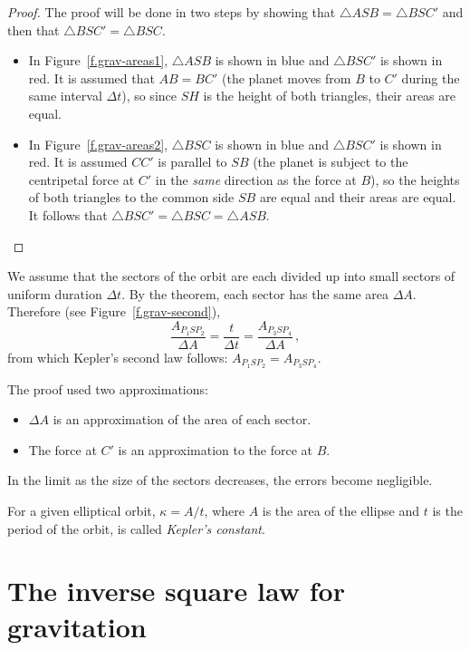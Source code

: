 \begin{proof}
The proof will be done in two steps by showing that $\triangle ASB=\triangle BSC'$ and then that $\triangle BSC'=\triangle BSC$.
\begin{itemize}
\item In Figure~\ref{f.grav-areas1}, $\triangle ASB$ is shown in blue and $\triangle BSC'$ is shown in red. It is assumed that $AB=BC'$ (the planet moves from $B$ to $C'$ during the same interval $\Delta t$), so since $SH$ is the height of both triangles, their areas are equal.
\item In Figure~\ref{f.grav-areas2}, $\triangle BSC$ is shown in blue and $\triangle BSC'$ is shown in red. It is assumed $CC'$ is parallel to $SB$ (the planet is subject to the centripetal force at $C'$ in the \emph{same} direction as the force at $B$), so the heights of both triangles to the common side $SB$ are equal and their areas are equal. It follows that $\triangle BSC'=\triangle BSC=\triangle ASB$.\hqed
\end{itemize}
\end{proof}

We assume that the sectors of the orbit are each divided up into small sectors of uniform duration $\Delta t$. By the theorem, each sector has the same area $\Delta A$. Therefore (see Figure~\ref{f.grav-second}),
\[
\frac{A_{P_1SP_2}}{\Delta A} =\frac{t}{\Delta t} = \frac{A_{P_3SP_4}}{\Delta A}\,,
\]
from which Kepler's second law follows: $A_{P_1SP_2}=A_{P_3SP_4}$.

The proof used two approximations:
\begin{itemize}
\item $\Delta A$ is an approximation of the area of each sector.
\item The force at $C'$ is an approximation to the force at $B$.
\end{itemize}
In the limit as the size of the sectors decreases, the errors become negligible.

\begin{definition}\label{def.kappa}
For a given elliptical orbit, $\kappa=A/t$, where $A$ is the area of the ellipse and $t$ is the period of the orbit, is called \emph{Kepler's constant}.
\end{definition}


\section{The inverse square law for gravitation}

